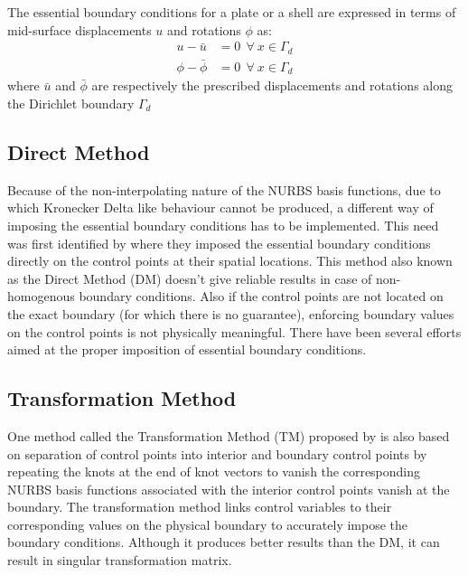 \documentclass[12pt, a4paper]{report}
\begin{document}
The essential boundary conditions for a plate or a shell are expressed in terms of mid-surface displacements $u$ and rotations $\phi$ as:
\begin{align}
    u- \bar{u} &= 0 ~~\forall ~x \in \Gamma_d \\
    \phi- \bar{\phi} &= 0 ~~\forall ~x \in \Gamma_d 
 \end{align}
 where $\bar{u}$ and $\bar{\phi}$ are respectively the prescribed displacements and rotations along the Dirichlet boundary $\Gamma_d$
\subsection{Direct Method}
Because of the non-interpolating nature of the NURBS basis functions, due to which Kronecker Delta like behaviour cannot be produced, a different way of imposing the essential boundary conditions has to be implemented. This need was first identified by \cite{HUGHES20054135} where they imposed the essential boundary conditions directly on the control points at their spatial locations. This method also known as the Direct Method (DM) doesn't give reliable results in case of non-homogenous boundary conditions. Also if the control points are not located on the exact boundary (for which there is no guarantee), enforcing boundary values on the control points is not physically meaningful. There have been several efforts aimed at the proper imposition of essential boundary conditions.
\subsection{Transformation Method}
\par One method called the Transformation Method (TM) proposed by \cite{WANG20102425} is also based on separation of control points into interior and boundary control points by repeating the knots at the end of knot vectors to vanish the corresponding NURBS basis functions associated with the interior control points vanish at the boundary. The transformation method links control variables to their corresponding values on the physical boundary to accurately impose the boundary conditions. Although it produces better results than the DM, it can result in singular transformation matrix.
\end{document}
